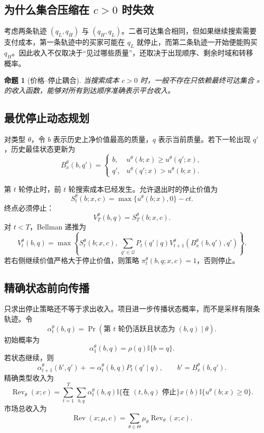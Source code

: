 \documentclass[11pt,a4paper]{ctexart}
\newtheorem{proposition}{命题}[section]
\newcommand{\Qset}{\mathcal Q}
\newcommand{\Types}{\Theta}
\newcommand{\Rev}{\operatorname{Rev}}
\newcommand{\ind}{\mathbb I}
\begin{document}
\subsection{为什么集合压缩在 \texorpdfstring{$c>0$}{c > 0} 时失效}

考虑两条轨迹 $(q_L,q_H)$ 与 $(q_H,q_L)$。二者可达集合相同，但如果继续搜索需要支付成本，第一条轨迹中的买家可能在 $q_L$ 就停止，而第二条轨迹一开始便能购买 $q_H$。因此收入不仅取决于“见过哪些质量”，还取决于出现顺序、剩余时域和转移概率。

\begin{proposition}[价格--停止耦合]
当搜索成本 $c>0$ 时，一般不存在只依赖最终可达集合 $s$ 的收入函数，能够对所有到达顺序准确表示平台收入。
\end{proposition}

\subsection{最优停止动态规划}

对类型 $\theta$，令 $b$ 表示历史上净价值最高的质量，$q$ 表示当前质量。若下一轮出现 $q'$，历史最佳状态更新为
\[
B^\theta_x(b,q')=
\begin{cases}
b,&u^\theta(b;x)\ge u^\theta(q';x),\\
q',&u^\theta(q';x)>u^\theta(b;x).
\end{cases}
\]

第 $t$ 轮停止时，前 $t$ 轮搜索成本已经发生。允许退出时的停止价值为
\[
S_t^\theta(b;x,c)=\max\{u^\theta(b;x),0\}-ct.
\]
终点必须停止：
\[
V_T^\theta(b,q)=S_T^\theta(b;x,c).
\]
对 $t<T$，Bellman 递推为
\[
V_t^\theta(b,q)=
\max\left\{
S_t^\theta(b;x,c),\
\sum_{q'\in\Qset}P_t(q'\mid q)
V_{t+1}^\theta(B^\theta_x(b,q'),q')
\right\}.
\]
若右侧继续价值严格大于停止价值，则策略
$\pi_t^\theta(b,q;x,c)=1$，否则停止。

\subsection{精确状态前向传播}

只求出停止策略还不等于求出收入。项目进一步传播状态概率，而不是采样有限条轨迹。令
\[
\alpha_t^\theta(b,q)=
\Pr(\text{第 }t\text{ 轮仍活跃且状态为 }(b,q)\mid\theta).
\]
初始概率为
\[
\alpha_1^\theta(b,q)=\rho(q)\ind\{b=q\}.
\]
若状态继续，则
\[
\alpha_{t+1}^\theta(b',q')
\mathrel{+}=
\alpha_t^\theta(b,q)P_t(q'\mid q),
\qquad b'=B^\theta_x(b,q').
\]
精确类型收入为
\[
\Rev_\theta(x;c)=
\sum_{t=1}^{T}\sum_{b,q}
\alpha_t^\theta(b,q)
\ind\{\text{在 }(t,b,q)\text{ 停止}\}
x(b)\ind\{u^\theta(b;x)\ge0\}.
\]
市场总收入为
\[
\Rev(x;\mu,c)=\sum_{\theta\in\Types}\mu_\theta\Rev_\theta(x;c).
\]
\end{document}
